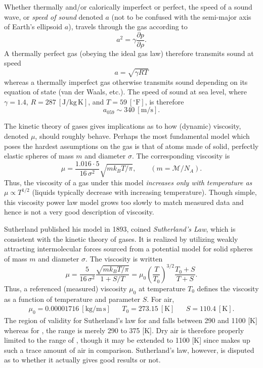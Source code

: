\documentclass[11pt,dvipsnames]{thesis}
\begin{document}
Whether thermally and/or calorically imperfect or perfect, the speed of a sound wave, or \textit{speed of sound} denoted $a$ (not to be confused with the semi-major axis of Earth's ellipsoid $a$), travels through the gas according to
\begin{equation}
a^2 = \gamma \frac{\partial p}{\partial \rho}. \label{eq:SpeedOfSound}
\end{equation}
A thermally perfect gas (obeying the ideal gas law) therefore transmits sound at speed
\begin{equation}
a = \sqrt{\gamma R T} \label{eq:SpeedOfSoundIdeal}
\end{equation}
whereas a thermally imperfect gas otherwise transmits sound depending on its equation of state (van der Waals, etc.). The speed of sound at sea level, where $\gamma = 1.4$, $R = 287 \ [\si{\J/\kg\,\K}]$, and $T = 59\ [^\circ\mathrm{F}]$, is therefore
\begin{equation}
a_{059} \sim 340 \ [\si{\m/\s}].
\end{equation}

The kinetic theory of gases gives implications as to how (dynamic) viscosity, denoted $\mu$, should roughly behave. Perhaps the most fundamental model which poses the hardest assumptions on the gas is that of atoms made of solid, perfectly elastic spheres of mass $m$ and diameter $\sigma$. The corresponding viscosity is
\begin{equation}
\mu = \frac{1.016 \cdot 5}{16 \,\sigma^2} \sqrt{m k_B T / \pi}, \qquad (m = \mathcal{M} / N_A).
\end{equation}
Thus, the viscosity of a gas under this model \textit{increases only with temperature as $\mu \propto T^{1/2}$} (liquids typically decrease with increasing temperature). Though simple, this viscosity power law model grows too slowly to match measured data and hence is not a very good description of viscosity.

Sutherland published his model in 1893, coined \textit{Sutherland's Law}, which is consistent with the kinetic theory of gases. It is realized by utilizing weakly attracting intermolecular forces sourced from a potential model for solid spheres of mass $m$ and diameter $\sigma$. The viscosity is written
\begin{equation}
\mu = \frac{5}{16\,\sigma^2} \frac{\sqrt{m k_B T / \pi}}{1 + S / T} = \mu_0 \left(\frac{T}{T_0}\right)^{\!3/2} \frac{T_0 + S}{T + S}.
\end{equation}
Thus, a referenced (measured) viscosity $\mu_0$ at temperature $T_0$ defines the viscosity as a function of temperature and parameter $S$. For air,
\begin{align}
\mu_0 = 0.00001716 \ [\si{\kg / \m\,\s}] && T_0 = 273.15 \ [\si{\K}] && S = 110.4 \ [\si{\K}].
\end{align}
The region of validity for Sutherland's law for  and  falls between 290 and 1100 [\si{\K}] whereas for , the range is merely 290 to 375 [\si{\K}]. Dry air is therefore properly limited to the range of , though it may be extended to 1100 [\si{\K}] since  makes up such a trace amount of air in comparison.
Sutherland's law, however, is disputed as to whether it actually gives good results or not.
\end{document}
